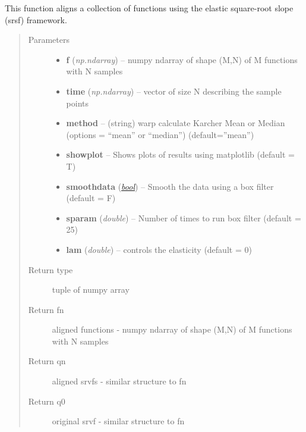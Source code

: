 \documentclass[letterpaper,10pt,english]{sphinxmanual}
\begin{document}
\begin{fulllineitems}
\label{time_warping:time_warping.srsf_align}
This function aligns a collection of functions using the elastic square-root slope (srsf) framework.
\begin{quote}\begin{description}
\item[{Parameters}] \leavevmode\begin{itemize}
\item {} 
\textbf{f} (\emph{np.ndarray}) -- numpy ndarray of shape (M,N) of M functions with N samples

\item {} 
\textbf{time} (\emph{np.ndarray}) -- vector of size N describing the sample points

\item {} 
\textbf{method} -- (string) warp calculate Karcher Mean or Median (options = ``mean'' or ``median'') (default=''mean'')

\item {} 
\textbf{showplot} -- Shows plots of results using matplotlib (default = T)

\item {} 
\textbf{smoothdata} (\href{http://docs.python.org/library/functions.html\#bool}{\emph{bool}}) -- Smooth the data using a box filter (default = F)

\item {} 
\textbf{sparam} (\emph{double}) -- Number of times to run box filter (default = 25)

\item {} 
\textbf{lam} (\emph{double}) -- controls the elasticity (default = 0)

\end{itemize}

\item[{Return type}] \leavevmode
tuple of numpy array

\item[{Return fn}] \leavevmode
aligned functions - numpy ndarray of shape (M,N) of M functions with N samples

\item[{Return qn}] \leavevmode
aligned srvfs - similar structure to fn

\item[{Return q0}] \leavevmode
original srvf - similar structure to fn


\end{description}
\end{quote}
\end{fulllineitems}
\end{document}
